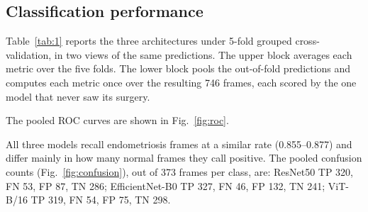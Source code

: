 \documentclass[preprint,12pt]{elsarticle}
\begin{document}
\subsection{Classification performance}
\label{sec:classification}

Table~\ref{tab:1} reports the three architectures under 5-fold grouped cross-validation, in two views of the same predictions. The upper block averages each metric over the five folds. The lower block pools the out-of-fold predictions and computes each metric once over the resulting 746 frames, each scored by the one model that never saw its surgery.

\begin{table}[t]
\centering
\caption{Classification performance under 5-fold grouped cross-validation.}
\label{tab:1}
\small
\setlength{\tabcolsep}{4pt}
\end{table}

The pooled ROC curves are shown in Fig.~\ref{fig:roc}.

All three models recall endometriosis frames at a similar rate (0.855--0.877) and differ mainly in how many normal frames they call positive. The pooled confusion counts (Fig.~\ref{fig:confusion}), out of 373 frames per class, are: ResNet50 TP 320, FN 53, FP 87, TN 286; EfficientNet-B0 TP 327, FN 46, FP 132, TN 241; ViT-B/16 TP 319, FN 54, FP 75, TN 298.
\end{document}
